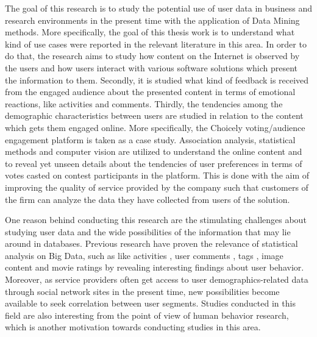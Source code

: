     The goal of this research is to study the potential use of user data in business and research environments in the present time with the application of Data Mining methods. More specifically, the goal of this thesis work is to understand what kind of use cases were reported in the relevant literature in this area. In order to do that, the research aims to study how content on the Internet is observed by the users and how users interact with various software solutions which present the information to them. Secondly, it is studied what kind of feedback is received from the engaged audience about the presented content in terms of emotional reactions, like activities and comments. Thirdly, the tendencies among the demographic characteristics between users are studied in relation to the content which gets them engaged online. More specifically, the Choicely voting/audience engagement platform is taken as a case study. Association analysis, statistical methods and computer vision are utilized to understand the online content and to reveal yet unseen details about the tendencies of user preferences in terms of votes casted on contest participants in the platform. This is done with the aim of improving the quality of service provided by the company such that customers of the firm can analyze the data they have collected from users of the solution.
    
    One reason behind conducting this research are the stimulating challenges about studying user data and the wide possibilities of the information that may lie around in databases. Previous research have proven the relevance of statistical analysis on Big Data, such as like activities \cite{jang2015noreciprocity, jang2016teensengagemorewithfewerphotos, ottoni2013ladies, guy2016whatsyourorganizationlike, jang2015no, youyou2015computer}, user comments \cite{jang2016teensengagemorewithfewerphotos}, tags \cite{jang2016teensengagemorewithfewerphotos}, image content \cite{hu2014we, bakhshi2014faces} and movie ratings \cite{saraee2004data, kabinsingha2012movie} by revealing interesting findings about user behavior. Moreover, as service providers often get access to user demographics-related data through social network sites in the present time, new possibilities become available to seek correlation between user segments. Studies conducted in this field are also interesting from the point of view of human behavior research, which is another motivation towards conducting studies in this area. 

